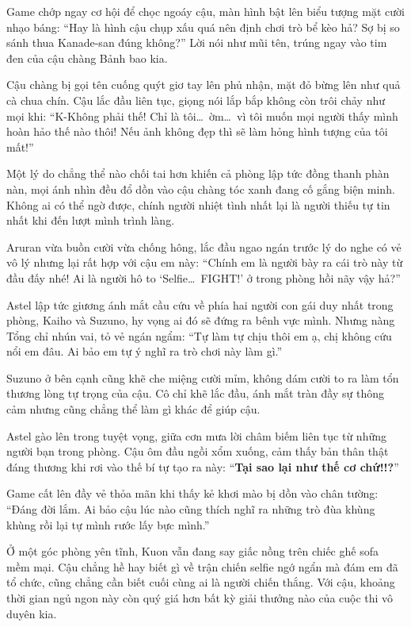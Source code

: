 \documentclass[../main.tex]{subfiles}
\begin{document}

Game chớp ngay cơ hội để chọc ngoáy cậu, màn hình bật lên biểu tượng mặt cười nhạo báng: ``Hay là hình cậu chụp xấu quá nên định chơi trò bể kèo hả? Sợ bị so sánh thua Kanade-san đúng không?'' Lời nói như mũi tên, trúng ngay vào tim đen của cậu chàng Bảnh bao kia.

Cậu chàng bị gọi tên cuống quýt giơ tay lên phủ nhận, mặt đỏ bừng lên như quả cà chua chín. Cậu lắc đầu liên tục, giọng nói lắp bắp không còn trôi chảy như mọi khi: ``K-Không phải thế! Chỉ là tôi\dots\ ờm\dots\ vì tôi muốn mọi người thấy mình hoàn hảo thế nào thôi! Nếu ảnh không đẹp thì sẽ làm hỏng hình tượng của tôi mất!''

Một lý do chẳng thể nào chối tai hơn khiến cả phòng lập tức đồng thanh phàn nàn, mọi ánh nhìn đều đổ dồn vào cậu chàng tóc xanh đang cố gắng biện minh. Không ai có thể ngờ được, chính người nhiệt tình nhất lại là người thiếu tự tin nhất khi đến lượt mình trình làng.

Aruran vừa buồn cười vừa chống hông, lắc đầu ngao ngán trước lý do nghe có vẻ vô lý nhưng lại rất hợp với cậu em này: ``Chính em là người bày ra cái trò này từ đầu đấy nhé! Ai là người hô to `Selfie\dots\ FIGHT!' ở trong phòng hồi nãy vậy hả?''

Astel lập tức giương ánh mắt cầu cứu về phía hai người con gái duy nhất trong phòng, Kaiho và Suzuno, hy vọng ai đó sẽ đứng ra bênh vực mình. Nhưng nàng Tổng chỉ nhún vai, tỏ vẻ ngán ngẩm: ``Tự làm tự chịu thôi em ạ, chị không cứu nổi em đâu. Ai bảo em tự ý nghĩ ra trò chơi này làm gì.''

Suzuno ở bên cạnh cũng khẽ che miệng cười mỉm, không dám cười to ra làm tổn thương lòng tự trọng của cậu. Cô chỉ khẽ lắc đầu, ánh mắt tràn đầy sự thông cảm nhưng cũng chẳng thể làm gì khác để giúp cậu.

Astel gào lên trong tuyệt vọng, giữa cơn mưa lời châm biếm liên tục từ những người bạn trong phòng. Cậu ôm đầu ngồi xổm xuống, cảm thấy bản thân thật đáng thương khi rơi vào thế bí tự tạo ra này: ``\textbf{Tại sao lại như thế cơ chứ!!?}''

Game cất lên đầy vẻ thỏa mãn khi thấy kẻ khơi mào bị dồn vào chân tường: ``Đáng đời lắm. Ai bảo cậu lúc nào cũng thích nghĩ ra những trò đùa khùng khùng rồi lại tự mình rước lấy bực mình.''

Ở một góc phòng yên tĩnh, Kuon vẫn đang say giấc nồng trên chiếc ghế sofa mềm mại. Cậu chẳng hề hay biết gì về trận chiến selfie ngớ ngẩn mà đám em đã tổ chức, cũng chẳng cần biết cuối cùng ai là người chiến thắng. Với cậu, khoảng thời gian ngủ ngon này còn quý giá hơn bất kỳ giải thưởng nào của cuộc thi vô duyên kia.
\end{document}
